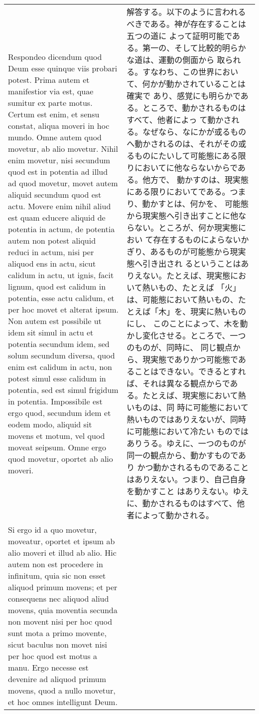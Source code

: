 \documentclass[10pt]{jsarticle}
\begin{document}
\begin{longtable}{p{21em}p{21em}}
{\sc Respondeo dicendum} quod Deum esse quinque viis probari
potest. Prima autem et manifestior via est, quae sumitur ex parte
motus. Certum est enim, et sensu constat, aliqua moveri in hoc
mundo. Omne autem quod movetur, ab alio movetur. Nihil enim movetur,
nisi secundum quod est in potentia ad illud ad quod movetur, movet
autem aliquid secundum quod est actu. Movere enim nihil aliud est quam
educere aliquid de potentia in actum, de potentia autem non potest
aliquid reduci in actum, nisi per aliquod ens in actu, sicut calidum
in actu, ut ignis, facit lignum, quod est calidum in potentia, esse
actu calidum, et per hoc movet et alterat ipsum. Non autem est
possibile ut idem sit simul in actu et potentia secundum idem, sed
solum secundum diversa, quod enim est calidum in actu, non potest
simul esse calidum in potentia, sed est simul frigidum in
potentia. Impossibile est ergo quod, secundum idem et eodem modo,
aliquid sit movens et motum, vel quod moveat seipsum. Omne ergo quod
movetur, oportet ab alio moveri.

& 

解答する。以下のように言われるべきである。神が存在することは五つの道に
よって証明可能である。第一の、そして比較的明らかな道は、運動の側面から
取られる。すなわち、この世界において、何かが動かされていることは確実で
あり、感覚にも明らかである。ところで、動かされるものはすべて、他者によっ
て動かされる。なぜなら、なにかが或るものへ動かされるのは、それがその或
るものにたいして可能態にある限りにおいてに他ならないからである。他方で、
動かすのは、現実態にある限りにおいてである。つまり、動かすとは、何かを、
可能態から現実態へ引き出すことに他ならない。ところが、何か現実態におい
て存在するものによらないかぎり、あるものが可能態から現実態へ引き出され
るということはありえない。たとえば、現実態において熱いもの、たとえば
「火」は、可能態において熱いもの、たとえば「木」を、現実に熱いものにし、
このことによって、木を動かし変化させる。ところで、一つのものが、同時に、
同じ観点から、現実態でありかつ可能態であることはできない。できるとすれ
ば、それは異なる観点からである。たとえば、現実態において熱いものは、同
時に可能態において熱いものではありえないが、同時に可能態において冷たい
ものではありうる。ゆえに、一つのものが同一の観点から、動かすものであり
かつ動かされるものであることはありえない。つまり、自己自身を動かすこと
はありえない。ゆえに、動かされるものはすべて、他者によって動かされる。

\\

Si ergo id a quo movetur, moveatur, oportet et ipsum ab alio moveri et
illud ab alio. Hic autem non est procedere in infinitum, quia sic non
esset aliquod primum movens; et per consequens nec aliquod aliud
movens, quia moventia secunda non movent nisi per hoc quod sunt mota a
primo movente, sicut baculus non movet nisi per hoc quod est motus a
manu. Ergo necesse est devenire ad aliquod primum movens, quod a nullo
movetur, et hoc omnes intelligunt Deum.


\end{longtable}
\end{document}
